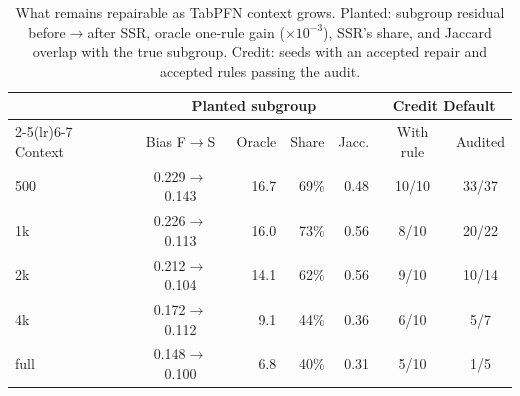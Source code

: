 \begin{table}[t]
\centering
\caption{What remains repairable as TabPFN context grows. Planted: subgroup residual before$\to$after SSR, oracle one-rule gain ($\times10^{-3}$), SSR's share, and Jaccard overlap with the true subgroup. Credit: seeds with an accepted repair and accepted rules passing the audit.}
\label{tab:diag}
\footnotesize\setlength{\tabcolsep}{3.2pt}
\begin{tabular}{lcrrrcc}
\toprule
 & \multicolumn{4}{c}{Planted subgroup} & \multicolumn{2}{c}{Credit Default} \\
\cmidrule(lr){2-5}\cmidrule(lr){6-7}
Context & Bias F$\to$S & Oracle & Share & Jacc. & With rule & Audited \\
\midrule
500 & 0.229$\to$0.143 & 16.7 & 69\% & 0.48 & 10/10 & 33/37 \\
1k & 0.226$\to$0.113 & 16.0 & 73\% & 0.56 & 8/10 & 20/22 \\
2k & 0.212$\to$0.104 & 14.1 & 62\% & 0.56 & 9/10 & 10/14 \\
4k & 0.172$\to$0.112 & 9.1 & 44\% & 0.36 & 6/10 & 5/7 \\
full & 0.148$\to$0.100 & 6.8 & 40\% & 0.31 & 5/10 & 1/5 \\
\bottomrule
\end{tabular}
\end{table}
